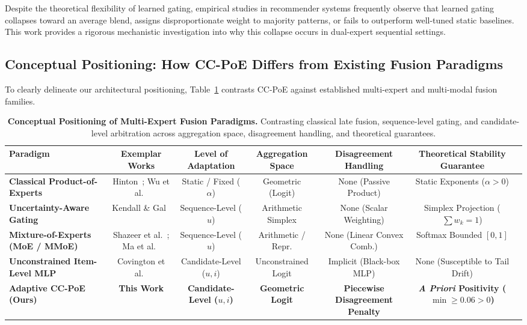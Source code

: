 Despite the theoretical flexibility of learned gating, empirical studies in recommender systems frequently observe that learned gating collapses toward an average blend, assigns disproportionate weight to majority patterns, or fails to outperform well-tuned static baselines. This work provides a rigorous mechanistic investigation into why this collapse occurs in dual-expert sequential settings.

\subsection{Conceptual Positioning: How CC-PoE Differs from Existing Fusion Paradigms}
\label{sec:related_positioning}

To clearly delineate our architectural positioning, Table~\ref{tab:fusion_paradigms} contrasts CC-PoE against established multi-expert and multi-modal fusion families.

\begin{table}[t]
\centering
\small
\caption{\textbf{Conceptual Positioning of Multi-Expert Fusion Paradigms.} Contrasting classical late fusion, sequence-level gating, and candidate-level arbitration across aggregation space, disagreement handling, and theoretical guarantees.}
\label{tab:fusion_paradigms}
\begin{tabular}{lcccccc}
\toprule
\textbf{Paradigm} & \textbf{Exemplar Works} & \textbf{Level of Adaptation} & \textbf{Aggregation Space} & \textbf{Disagreement Handling} & \textbf{Theoretical Stability Guarantee} \\
\midrule
\textbf{Classical Product-of-Experts} & Hinton~\cite{hinton2002training}; Wu et al.~\cite{wu2021multimodal} & Static / Fixed ($\alpha$) & Geometric (Logit) & None (Passive Product) & Static Exponents ($\alpha > 0$) \\
\textbf{Uncertainty-Aware Gating} & Kendall \& Gal~\cite{kendall2017uncertainties} & Sequence-Level ($u$) & Arithmetic Simplex & None (Scalar Weighting) & Simplex Projection ($\sum w_k = 1$) \\
\textbf{Mixture-of-Experts (MoE / MMoE)} & Shazeer et al.~\cite{shazeer2017outrageously}; Ma et al.~\cite{ma2018modeling} & Sequence-Level ($u$) & Arithmetic / Repr. & None (Linear Convex Comb.) & Softmax Bounded $[0, 1]$ \\
\textbf{Unconstrained Item-Level MLP} & Covington et al.~\cite{covington2016deep} & Candidate-Level ($u, i$) & Unconstrained Logit & Implicit (Black-box MLP) & None (Susceptible to Tail Drift) \\
\midrule
\textbf{Adaptive CC-PoE (Ours)} & \textbf{This Work} & \textbf{Candidate-Level ($u, i$)} & \textbf{Geometric Logit} & \textbf{Piecewise Disagreement Penalty} & \textbf{\emph{A Priori} Positivity ($\min \ge 0.06 > 0$)} \\
\bottomrule
\end{tabular}
\end{table}

